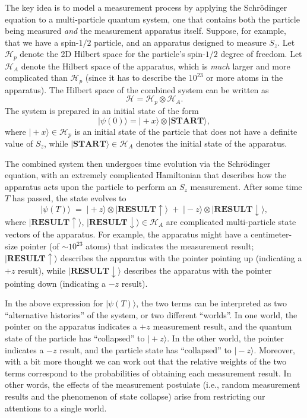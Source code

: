 \documentclass[pra,11pt]{revtex4}
\begin{document}
The key idea is to model a measurement process by applying the
Schr\"odinger equation to a multi-particle quantum system, one that
contains both the particle being measured \textit{and} the measurement
apparatus itself.  Suppose, for example, that we have a spin-$1/2$
particle, and an apparatus designed to measure $S_z$.  Let
$\mathscr{H}_p$ denote the 2D Hilbert space for the particle's
spin-$1/2$ degree of freedom.  Let $\mathscr{H}_A$ denote the Hilbert
space of the apparatus, which is \textit{much} larger and more
complicated than $\mathscr{H}_p$ (since it has to describe the
$10^{23}$ or more atoms in the apparatus).  The Hilbert space of the
combined system can be written as
$$\mathscr{H} = \mathscr{H}_p \otimes \mathscr{H}_A.$$
The system is prepared in an initial state of the form
$$|\psi(0)\rangle = |\!+x\rangle \otimes |\textbf{START}\rangle,$$
where $|\!+x\rangle \in \mathscr{H}_p$ is an initial state of the
particle that does not have a definite value of $S_z$, while
$|\textbf{START}\rangle \in \mathscr{H}_A$ denotes the initial state
of the apparatus.

The combined system then undergoes time evolution via the
Schr\"odinger equation, with an extremely complicated Hamiltonian that
describes how the apparatus acts upon the particle to perform an $S_z$
measurement.  After some time $T$ has passed, the state evolves to
$$|\psi(T)\rangle \;=\; |\!+z \rangle \otimes |\textbf{RESULT}\uparrow\rangle \;+\; |\!-z\rangle\otimes |\textbf{RESULT}\downarrow\rangle, $$
where $|\textbf{RESULT}\uparrow\rangle, \,
|\textbf{RESULT}\downarrow\rangle \in \mathscr{H}_A$ are complicated
multi-particle state vectors of the apparatus.  For example, the
apparatus might have a centimeter-size pointer (of $\sim 10^{23}$
atoms) that indicates the measurement result;
$|\textbf{RESULT}\uparrow\rangle$ describes the apparatus with the
pointer pointing up (indicating a $+z$ result), while
$|\textbf{RESULT}\downarrow\rangle$ describes the apparatus with the
pointer pointing down (indicating a $-z$ result).

In the above expression for $|\psi(T)\rangle$, the two terms can be
interpreted as two ``alternative histories'' of the system, or two
different ``worlds''.  In one world, the pointer on the apparatus
indicates a $+z$ measurement result, and the quantum state of the
particle has ``collapsed'' to $|\!+z\rangle$.  In the other world, the
pointer indicates a $-z$ result, and the particle state has
``collapsed'' to $|\!-z\rangle$.  Moreover, with a bit more thought we
can work out that the relative weights of the two terms correspond to
the probabilities of obtaining each measurement result.  In other
words, the effects of the measurement postulate (i.e., random
measurement results and the phenomenon of state collapse) arise from
restricting our attentions to a single world.
\end{document}
